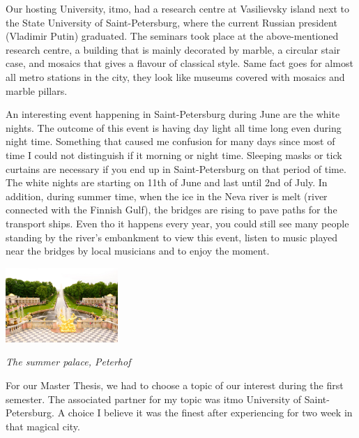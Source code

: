 \documentclass[10pt,a4paper]{article} %
\begin{document}
\begin{multicols}{3}
Our hosting University, {\sc itmo}, had a research centre at Vasilievsky island 
next to the State University of Saint-Petersburg, where the current Russian 
president (Vladimir Putin) graduated. 
The seminars took place at the above-mentioned research centre, a building that 
is mainly decorated by marble, a circular stair case, 
and mosaics that gives a flavour of classical style. 
Same fact goes for almost all metro stations in the city, they look like 
museums covered with mosaics and marble pillars. 

 
An interesting event happening in Saint-Petersburg during June are the white nights.
The outcome of this event is having day light all time long even during night 
time. 
Something that caused me confusion for many days since most of time I could not 
distinguish if it morning or night time. 
Sleeping masks or tick curtains are necessary if you end up in Saint-Petersburg 
on that period of time. 
The white nights are starting on 11th of June and last until 2nd of July.
In addition, during summer time, when the ice in the Neva river is melt (river 
connected with the Finnish Gulf), the bridges are rising to pave paths for the 
transport ships. 
Even tho it happens every year, you could still see many people standing by the 
river's embankment to view this event, listen to music played near the bridges by 
local musicians and to enjoy the moment.
 
 
\begin{center}
	\includegraphics[width=0.32\textwidth]{media/petergof.jpg}
	\par\textit{The summer palace, Peterhof}
\end{center}


For our Master Thesis, we had to choose a topic of our interest during the first 
semester. 
The associated partner for my topic was {\sc itmo} University of Saint-Petersburg. 
A choice I believe it was the finest after experiencing for two week in that 
magical city.


\end{multicols}
\end{document}
